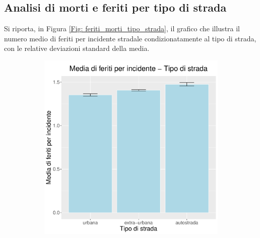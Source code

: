 \documentclass[12pt,a4paper,final,oneside]{article}			%
\begin{document}
    \subsection{Analisi di morti e feriti per tipo di strada}
        Si riporta, in Figura \ref{Fig: feriti_morti_tipo_strada}, il grafico che illustra il numero medio di feriti per incidente stradale condizionatamente al tipo di strada, con le relative deviazioni standard della media.
        \begin{figure}[h]
            \begin{subfigure}{0.4\textwidth}
                \centering
                \includegraphics[scale=0.4]{../results/media_feriti_per_incidente_tipo_strada.pdf}
            \end{subfigure}
            \hfill
            \begin{subfigure}{0.4\textwidth}
                \centering

\end{subfigure}
\end{figure}
\end{document}
